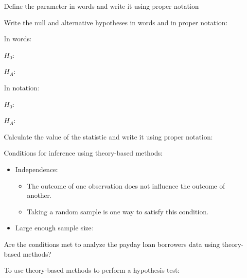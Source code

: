 \documentclass[
]{report}
\providecommand{\tightlist}{%
  \setlength{\itemsep}{0pt}\setlength{\parskip}{0pt}}
\newcommand{\rgi}{\hspace{24pt}}  %
\begin{document}
\vspace{0.3in}

Define the parameter in words and write it using proper notation

\vspace{0.5in}

Write the null and alternative hypotheses in words and in proper notation:

\rgi In words:

\rgi \rgi \(H_0:\)

\vspace{0.45in}

\rgi \rgi \(H_A:\)

\vspace{0.45in}

\rgi In notation:

\vspace{1mm}

\rgi \rgi \(H_0:\)

\vspace{0.2in}

\rgi \rgi \(H_A:\)

\vspace{0.2in}

Calculate the value of the statistic and write it using proper notation:

\vspace{0.2in}

Conditions for inference using theory-based methods:

\begin{itemize}
\item
  Independence:

  \begin{itemize}
  \tightlist
  \item
    The outcome of one observation does not influence the outcome of another.
  \item
    Taking a random sample is one way to satisfy this condition.
  \end{itemize}
\item
  Large enough sample size:
\end{itemize}

\vspace{1in}

Are the conditions met to analyze the payday loan borrowers data using theory-based methods?

\vspace{1in}

To use theory-based methods to perform a hypothesis test:
\end{document}
